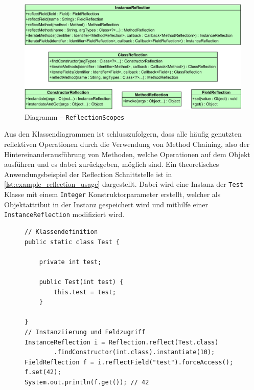 \begin{figure}[H]
	\centering
	\includegraphics[width=\textwidth]{Abbildungen/ReflectionScopes.png}
	\caption{Diagramm -- \texttt{ReflectionScopes}}
	\label{fig:reflection_scopes}
\end{figure}
\noindent Aus den Klassendiagrammen ist schlusszufolgern, dass alle häufig genutzten reflektiven Operationen durch die Verwendung von Method Chaining, also der Hintereinanderausführung von Methoden, welche Operationen auf dem Objekt ausführen und es dabei zurückgeben, möglich sind. Ein theoretisches Anwendungsbeispiel der Reflection Schnittstelle ist in \autoref{lst:example_reflection_usage} dargestellt. Dabei wird eine Instanz der \texttt{Test} Klasse mit einem \texttt{Integer} Konstruktorparameter erstellt, welcher als Objektattribut in der Instanz gespeichert wird und mithilfe einer \texttt{InstanceReflection} modifiziert wird.
\begin{figure}[H]
	\begin{lstlisting}[caption={Beispiel -- Verwendung der Reflection Schnittstelle.}, captionpos=b, label=lst:example_reflection_usage]
// Klassendefinition
public static class Test {

	private int test;

	public Test(int test) {
		this.test = test;
	}

}
// Instanziierung und Feldzugriff
InstanceReflection i = Reflection.reflect(Test.class)
		.findConstructor(int.class).instantiate(10);
FieldReflection f = i.reflectField("test").forceAccess();
f.set(42);
System.out.println(f.get()); // 42
	\end{lstlisting}
\end{figure}
